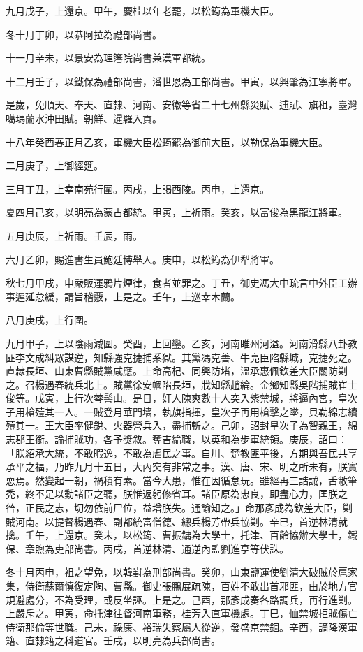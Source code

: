 \begin{pinyinscope}
九月戊子，上還京。甲午，慶桂以年老罷，以松筠為軍機大臣。

冬十月丁卯，以恭阿拉為禮部尚書。

十一月辛未，以景安為理籓院尚書兼漢軍都統。

十二月壬子，以鐵保為禮部尚書，潘世恩為工部尚書。甲寅，以興肇為江寧將軍。

是歲，免順天、奉天、直隸、河南、安徽等省二十七州縣災賦、逋賦、旗租，臺灣噶瑪蘭水沖田賦。朝鮮、暹羅入貢。

十八年癸酉春正月乙亥，軍機大臣松筠罷為御前大臣，以勒保為軍機大臣。

二月庚子，上御經筵。

三月丁丑，上幸南苑行圍。丙戌，上謁西陵。丙申，上還京。

夏四月己亥，以明亮為蒙古都統。甲寅，上祈雨。癸亥，以富俊為黑龍江將軍。

五月庚辰，上祈雨。壬辰，雨。

六月乙卯，賜進書生員鮑廷博舉人。庚申，以松筠為伊犁將軍。

秋七月甲戌，申嚴販運鴉片煙律，食者並罪之。丁丑，御史馮大中疏言中外臣工辦事遲延怠緩，請旨稽覈，上是之。壬午，上巡幸木蘭。

八月庚戌，上行圍。

九月甲子，上以陰雨減圍。癸酉，上回鑾。乙亥，河南睢州河溢。河南滑縣八卦教匪李文成糾眾謀逆，知縣強克捷捕系獄。其黨馮克善、牛亮臣陷縣城，克捷死之。直隸長垣、山東曹縣賊黨咸應。上命高杞、同興防堵，溫承惠佩欽差大臣關防剿之。召楊遇春統兵北上。賊黨徐安幗陷長垣，戕知縣趙綸。金鄉知縣吳階捕賊崔士俊等。戊寅，上行次棽髻山。是日，奸人陳爽數十人突入紫禁城，將逼內宮，皇次子用槍殪其一人。一賊登月華門墻，執旗指揮，皇次子再用槍擊之墜，貝勒綿志續殪其一。王大臣率健銳、火器營兵入，盡捕斬之。己卯，詔封皇次子為智親王，綿志郡王銜。論捕賊功，各予獎敘。奪吉綸職，以英和為步軍統領。庚辰，詔曰：「朕紹承大統，不敢暇逸，不敢為虐民之事。自川、楚教匪平後，方期與吾民共享承平之福，乃昨九月十五日，大內突有非常之事。漢、唐、宋、明之所未有，朕實恧焉。然變起一朝，禍積有素。當今大患，惟在因循怠玩。雖經再三誥誡，舌敝筆禿，終不足以動諸臣之聽，朕惟返躬修省耳。諸臣原為忠良，即盡心力，匡朕之咎，正民之志，切勿依前尸位，益增朕失。通諭知之。」命那彥成為欽差大臣，剿賊河南。以提督楊遇春、副都統富僧德、總兵楊芳帶兵協剿。辛巳，首逆林清就擒。壬午，上還京。癸未，以松筠、曹振鏞為大學士，托津、百齡協辦大學士，鐵保、章煦為吏部尚書。丙戌，首逆林清、通逆內監劉進亨等伏誅。

冬十月丙申，祖之望免，以韓崶為刑部尚書。癸卯，山東鹽運使劉清大破賊於扈家集，侍衛蘇爾慎復定陶、曹縣。御史張鵬展疏陳，百姓不敢出首邪匪，由於地方官規避處分，不為受理，或反坐誣。上是之。己酉，那彥成奏各路調兵，再行進剿。上嚴斥之。甲寅，命托津往督河南軍務，桂芳入直軍機處。丁巳，恤禁城拒賊傷亡侍衛那倫等世職。己未，祿康、裕瑞失察屬人從逆，發盛京禁錮。辛酉，謫降漢軍籍、直隸籍之科道官。壬戌，以明亮為兵部尚書。


\end{pinyinscope}
